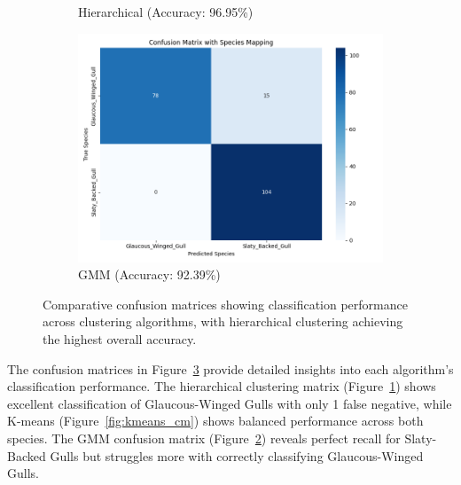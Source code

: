 \documentclass[a4paper,12pt]{report}
\begin{document}
\begin{figure}[H]
\begin{subfigure}[b]{0.32\textwidth}
        \caption{Hierarchical (Accuracy: 96.95\%)}
        \label{fig:hierarchical_cm}
    \end{subfigure}
    \hfill
    \begin{subfigure}[b]{0.32\textwidth}
        \centering
        \includegraphics[width=\textwidth]{images/clustering/gmm_confusion_matrix.png}
        \caption{GMM (Accuracy: 92.39\%)}
        \label{fig:gmm_cm}
    \end{subfigure}
    \caption{Comparative confusion matrices showing classification performance across clustering algorithms, with hierarchical clustering achieving the highest overall accuracy.}
    \label{fig:confusion_matrices}
\end{figure}

The confusion matrices in Figure~\ref{fig:confusion_matrices} provide detailed insights into each algorithm's classification performance. The hierarchical clustering matrix (Figure~\ref{fig:hierarchical_cm}) shows excellent classification of Glaucous-Winged Gulls with only 1 false negative, while K-means (Figure~\ref{fig:kmeans_cm}) shows balanced performance across both species. The GMM confusion matrix (Figure~\ref{fig:gmm_cm}) reveals perfect recall for Slaty-Backed Gulls but struggles more with correctly classifying Glaucous-Winged Gulls.
\end{document}
